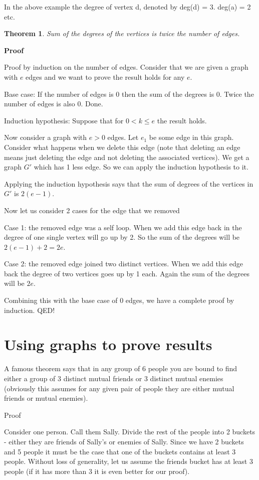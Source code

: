\documentclass[12pt]{article}
\newtheorem{theorem}{Theorem}
\begin{document}
In the above example the degree of vertex d, denoted by deg(d) = 3. deg(a) = 2 etc.

\begin{theorem}
Sum of the degrees of the vertices is twice the number of edges.
\end{theorem}

\textbf{Proof}

Proof by induction on the number of edges. Consider that we are given a graph with $e$ edges and we want to prove the result holds for any $e$.

Base case: If the number of edges is 0 then the sum of the degrees is 0. Twice the number of edges is also 0. Done.

Induction hypothesis: Suppose that for $0 < k \le e$  the result holds.

Now consider a graph with $e > 0$ edges. Let $e_1$ be some edge in this graph. Consider what happens when we delete this edge (note that deleting an edge means just deleting the edge and not deleting the associated vertices). We get a graph $G'$ which has 1 less edge. So we can apply the induction hypothesis to it.

Applying the induction hypothesis says that the sum of degrees of the vertices in $G'$ is $2(e-1)$.

Now let us consider 2 cases for the edge that we removed

Case 1: the removed edge was a self loop. When we add this edge back in the degree of one single vertex will go up by 2. So the sum of the degrees will be $2(e-1) + 2 = 2e$.

Case 2: the removed edge joined two distinct vertices. When we add this edge back the degree of two vertices goes up by 1 each. Again the sum of the degrees will be $2e$.


Combining this with the base case of 0 edges, we have a complete proof by induction. QED!

\section*{Using graphs to prove results}

A famous theorem says that in any group of 6 people you are bound to find either a group of 3 distinct mutual friends or 3 distinct mutual enemies (obviously this assumes for any given pair of people they are either mutual friends or mutual enemies). 

Proof

Consider one person. Call them Sally. Divide the rest of the people into 2 buckets - either they are friends of Sally's or enemies of Sally. Since we have 2 buckets and 5 people it must be the case that one of the buckets contains at least 3 people. Without loss of generality, let us assume the friends bucket has at least 3 people (if it has more than 3 it is even better for our proof).
\end{document}

